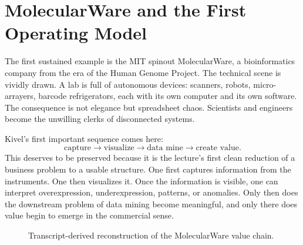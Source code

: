 \section{MolecularWare and the First Operating Model}

The first sustained example is the MIT spinout MolecularWare, a bioinformatics company from the era of the Human Genome Project. The technical scene is vividly drawn. A lab is full of autonomous devices: scanners, robots, micro-arrayers, barcode refrigerators, each with its own computer and its own software. The consequence is not elegance but spreadsheet chaos. Scientists and engineers become the unwilling clerks of disconnected systems.

Kivel's first important sequence comes here:
\begin{equation}
\text{capture} \to \text{visualize} \to \text{data mine} \to \text{create value}.
\end{equation}
This deserves to be preserved because it is the lecture's first clean reduction of a business problem to a usable structure. One first captures information from the instruments. One then visualizes it. Once the information is visible, one can interpret overexpression, underexpression, patterns, or anomalies. Only then does the downstream problem of data mining become meaningful, and only there does value begin to emerge in the commercial sense.

\begin{figure}[htbp]
\centering
{}
\caption{Transcript-derived reconstruction of the MolecularWare value chain.}
\end{figure}

